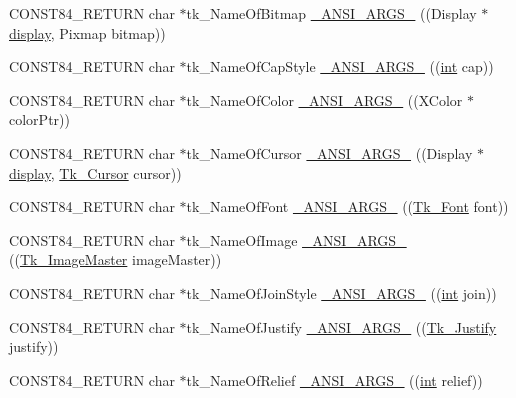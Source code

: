 \begin{DoxyCompactItemize}
\item 
C\+O\+N\+S\+T84\+\_\+\+R\+E\+T\+U\+RN char $\ast$tk\+\_\+\+Name\+Of\+Bitmap \hyperlink{struct_tk_stubs_ab3598acb35f050de97d58727d7f9f4e7}{\+\_\+\+A\+N\+S\+I\+\_\+\+A\+R\+G\+S\+\_\+} ((Display $\ast$\hyperlink{tk_8h_afc08b650bd5c7e58f8133cc830a2ef84}{display}, Pixmap bitmap))
\item 
C\+O\+N\+S\+T84\+\_\+\+R\+E\+T\+U\+RN char $\ast$tk\+\_\+\+Name\+Of\+Cap\+Style \hyperlink{struct_tk_stubs_aaacf1ddf415a270a0286745965ca86b5}{\+\_\+\+A\+N\+S\+I\+\_\+\+A\+R\+G\+S\+\_\+} ((\hyperlink{tk_8h_a83f82f76e7fed06f4c49d2db94028a6d}{int} cap))
\item 
C\+O\+N\+S\+T84\+\_\+\+R\+E\+T\+U\+RN char $\ast$tk\+\_\+\+Name\+Of\+Color \hyperlink{struct_tk_stubs_a6305cfa32025b67754064873df71029c}{\+\_\+\+A\+N\+S\+I\+\_\+\+A\+R\+G\+S\+\_\+} ((X\+Color $\ast$color\+Ptr))
\item 
C\+O\+N\+S\+T84\+\_\+\+R\+E\+T\+U\+RN char $\ast$tk\+\_\+\+Name\+Of\+Cursor \hyperlink{struct_tk_stubs_ae72de6dd6c8629f13e53a50df4a04cdd}{\+\_\+\+A\+N\+S\+I\+\_\+\+A\+R\+G\+S\+\_\+} ((Display $\ast$\hyperlink{tk_8h_afc08b650bd5c7e58f8133cc830a2ef84}{display}, \hyperlink{tk_8h_a9505b763a290e218b96e0e83fc275691}{Tk\+\_\+\+Cursor} cursor))
\item 
C\+O\+N\+S\+T84\+\_\+\+R\+E\+T\+U\+RN char $\ast$tk\+\_\+\+Name\+Of\+Font \hyperlink{struct_tk_stubs_a914cfa3dd20ef3fab009c22987b22d12}{\+\_\+\+A\+N\+S\+I\+\_\+\+A\+R\+G\+S\+\_\+} ((\hyperlink{tk_8h_a9fc14938fbad69507d71d60fe79e26f6}{Tk\+\_\+\+Font} font))
\item 
C\+O\+N\+S\+T84\+\_\+\+R\+E\+T\+U\+RN char $\ast$tk\+\_\+\+Name\+Of\+Image \hyperlink{struct_tk_stubs_acf6e74c994ef5812513d53fe67767652}{\+\_\+\+A\+N\+S\+I\+\_\+\+A\+R\+G\+S\+\_\+} ((\hyperlink{tk_8h_ad1c40558b614f021b1ee67583405e5f3}{Tk\+\_\+\+Image\+Master} image\+Master))
\item 
C\+O\+N\+S\+T84\+\_\+\+R\+E\+T\+U\+RN char $\ast$tk\+\_\+\+Name\+Of\+Join\+Style \hyperlink{struct_tk_stubs_a994c4d46323832925f346f291cc7a2c1}{\+\_\+\+A\+N\+S\+I\+\_\+\+A\+R\+G\+S\+\_\+} ((\hyperlink{tk_8h_a83f82f76e7fed06f4c49d2db94028a6d}{int} join))
\item 
C\+O\+N\+S\+T84\+\_\+\+R\+E\+T\+U\+RN char $\ast$tk\+\_\+\+Name\+Of\+Justify \hyperlink{struct_tk_stubs_a7885b89c0383444f9749b552bed0c8b7}{\+\_\+\+A\+N\+S\+I\+\_\+\+A\+R\+G\+S\+\_\+} ((\hyperlink{tk_8h_a2c8a512a18c19d2498860e209884d50c}{Tk\+\_\+\+Justify} justify))
\item 
C\+O\+N\+S\+T84\+\_\+\+R\+E\+T\+U\+RN char $\ast$tk\+\_\+\+Name\+Of\+Relief \hyperlink{struct_tk_stubs_aece4eac114fb4ff9df03e2844ce6053f}{\+\_\+\+A\+N\+S\+I\+\_\+\+A\+R\+G\+S\+\_\+} ((\hyperlink{tk_8h_a83f82f76e7fed06f4c49d2db94028a6d}{int} relief))

\end{DoxyCompactItemize}
